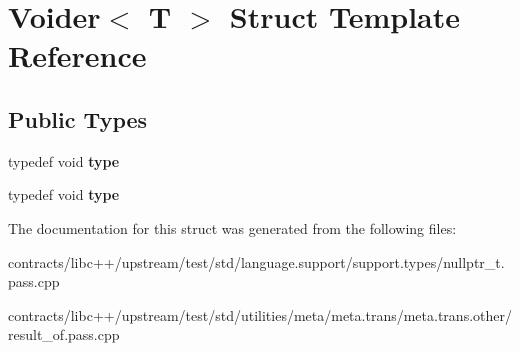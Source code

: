 \hypertarget{struct_voider}{}\section{Voider$<$ T $>$ Struct Template Reference}
\label{struct_voider}
\subsection*{Public Types}
\begin{DoxyCompactItemize}
\item 
\mbox{\label{struct_voider_ab596717b9f2bb726750bfae00a16322f}} 
typedef void {\bfseries type}
\item 
\mbox{\label{struct_voider_ab596717b9f2bb726750bfae00a16322f}} 
typedef void {\bfseries type}
\end{DoxyCompactItemize}


The documentation for this struct was generated from the following files\+:\begin{DoxyCompactItemize}
\item 
contracts/libc++/upstream/test/std/language.\+support/support.\+types/nullptr\+\_\+t.\+pass.\+cpp\item 
contracts/libc++/upstream/test/std/utilities/meta/meta.\+trans/meta.\+trans.\+other/result\+\_\+of.\+pass.\+cpp\end{DoxyCompactItemize}
